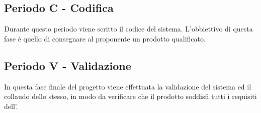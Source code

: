 \documentclass[./PianoDiProgetto.tex]{subfiles}
\begin{document}
  \subsection{Periodo C - Codifica}

  Durante questo periodo viene scritto il codice del sistema. L'obbiettivo
  di questa fase è quello di consegnare al proponente un prodotto qualificato.

  \subsection{Periodo V - Validazione}

  In questa fase finale del progetto viene effettuata la validazione del sistema ed il
  collaudo dello stesso, in modo da verificare che il prodotto soddisfi tutti i requisiti
  dell'\ARdoc. 
\end{document}
